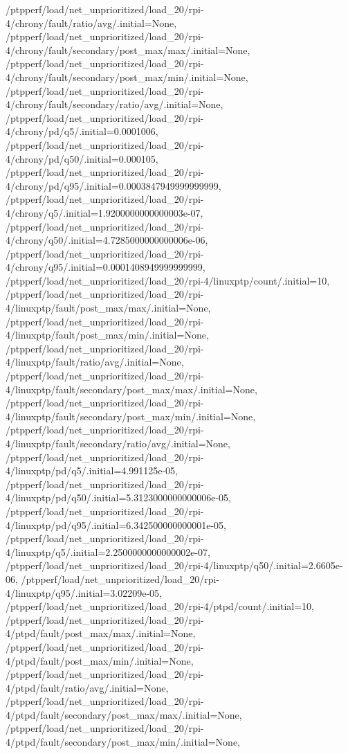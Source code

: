 {    /ptpperf/load/net_unprioritized/load_20/rpi-4/chrony/fault/ratio/avg/.initial=None,
    /ptpperf/load/net_unprioritized/load_20/rpi-4/chrony/fault/secondary/post_max/max/.initial=None,
    /ptpperf/load/net_unprioritized/load_20/rpi-4/chrony/fault/secondary/post_max/min/.initial=None,
    /ptpperf/load/net_unprioritized/load_20/rpi-4/chrony/fault/secondary/ratio/avg/.initial=None,
    /ptpperf/load/net_unprioritized/load_20/rpi-4/chrony/pd/q5/.initial=0.0001006,
    /ptpperf/load/net_unprioritized/load_20/rpi-4/chrony/pd/q50/.initial=0.000105,
    /ptpperf/load/net_unprioritized/load_20/rpi-4/chrony/pd/q95/.initial=0.0003847949999999999,
    /ptpperf/load/net_unprioritized/load_20/rpi-4/chrony/q5/.initial=1.9200000000000003e-07,
    /ptpperf/load/net_unprioritized/load_20/rpi-4/chrony/q50/.initial=4.7285000000000006e-06,
    /ptpperf/load/net_unprioritized/load_20/rpi-4/chrony/q95/.initial=0.0001408949999999999,
    /ptpperf/load/net_unprioritized/load_20/rpi-4/linuxptp/count/.initial=10,
    /ptpperf/load/net_unprioritized/load_20/rpi-4/linuxptp/fault/post_max/max/.initial=None,
    /ptpperf/load/net_unprioritized/load_20/rpi-4/linuxptp/fault/post_max/min/.initial=None,
    /ptpperf/load/net_unprioritized/load_20/rpi-4/linuxptp/fault/ratio/avg/.initial=None,
    /ptpperf/load/net_unprioritized/load_20/rpi-4/linuxptp/fault/secondary/post_max/max/.initial=None,
    /ptpperf/load/net_unprioritized/load_20/rpi-4/linuxptp/fault/secondary/post_max/min/.initial=None,
    /ptpperf/load/net_unprioritized/load_20/rpi-4/linuxptp/fault/secondary/ratio/avg/.initial=None,
    /ptpperf/load/net_unprioritized/load_20/rpi-4/linuxptp/pd/q5/.initial=4.991125e-05,
    /ptpperf/load/net_unprioritized/load_20/rpi-4/linuxptp/pd/q50/.initial=5.3123000000000006e-05,
    /ptpperf/load/net_unprioritized/load_20/rpi-4/linuxptp/pd/q95/.initial=6.342500000000001e-05,
    /ptpperf/load/net_unprioritized/load_20/rpi-4/linuxptp/q5/.initial=2.2500000000000002e-07,
    /ptpperf/load/net_unprioritized/load_20/rpi-4/linuxptp/q50/.initial=2.6605e-06,
    /ptpperf/load/net_unprioritized/load_20/rpi-4/linuxptp/q95/.initial=3.02209e-05,
    /ptpperf/load/net_unprioritized/load_20/rpi-4/ptpd/count/.initial=10,
    /ptpperf/load/net_unprioritized/load_20/rpi-4/ptpd/fault/post_max/max/.initial=None,
    /ptpperf/load/net_unprioritized/load_20/rpi-4/ptpd/fault/post_max/min/.initial=None,
    /ptpperf/load/net_unprioritized/load_20/rpi-4/ptpd/fault/ratio/avg/.initial=None,
    /ptpperf/load/net_unprioritized/load_20/rpi-4/ptpd/fault/secondary/post_max/max/.initial=None,
    /ptpperf/load/net_unprioritized/load_20/rpi-4/ptpd/fault/secondary/post_max/min/.initial=None,
}
